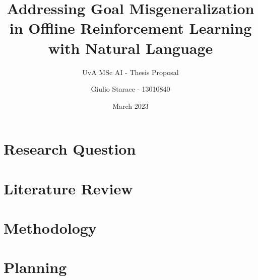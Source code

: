 \documentclass[12pt, headings=standardclasses]{scrartcl}
\title{Addressing Goal Misgeneralization in Offline Reinforcement Learning with Natural Language}
\subtitle{UvA MSc AI - Thesis Proposal}
\begin{document}
\author{Giulio Starace - 13010840}
\date{March 2023}
\maketitle
\section{Research Question}

\section{Literature Review}

\section{Methodology}

\section{Planning}



\end{document}
